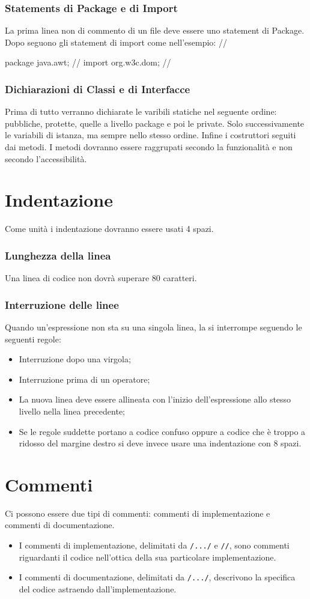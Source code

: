 \documentclass[11pt,titlepage,a4paper]{report}
\begin{document}
\subsection{Statements di Package e di Import}
La prima linea non di commento di un file deve essere uno statement di Package. Dopo seguono gli statement di import come nell'esempio: //
     
package java.awt; // %
import org.w3c.dom; //
\subsection{Dichiarazioni di Classi e di Interfacce}
Prima di tutto verranno dichiarate le varibili statiche nel seguente ordine: pubbliche, protette, quelle a livello package e poi le private. Solo successivamente le variabili di istanza, ma sempre nello stesso ordine. Infine i costruttori seguiti dai metodi. I metodi dovranno essere raggrupati secondo la funzionalit\`a e non secondo l'accessibilit\`a.

\chapter{Indentazione}
Come unit\`a i indentazione dovranno essere usati 4 spazi.
\subsection{Lunghezza della linea}
Una linea di codice non dovr\`a superare 80 caratteri.
\subsection{Interruzione delle linee}
Quando un'espressione non sta su una singola linea, la si interrompe seguendo le seguenti regole:
\begin{itemize}
\item Interruzione dopo una virgola;
\item Interruzione prima di un operatore;
\item La nuova linea deve essere allineata con l'inizio dell'espressione allo stesso livello nella linea precedente;
\item Se le regole suddette portano a codice confuso oppure a codice che è troppo a ridosso del margine destro si deve invece usare una indentazione con 8 spazi.
\end{itemize}

\chapter{Commenti}
Ci possono essere due tipi di commenti: commenti di implementazione e commenti di documentazione. 
\begin{itemize}
\item I commenti di implementazione, delimitati da \texttt{/\ast...\ast/} e \texttt{//}, sono commenti riguardanti il codice nell'ottica della sua particolare implementazione. 
\item I commenti di documentazione, delimitati da \texttt{/\ast\ast...\ast/}, descrivono la specifica del codice astraendo dall'implementazione.
\end{itemize}
\end{document}
